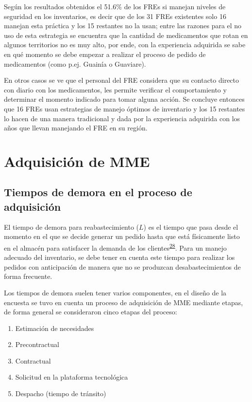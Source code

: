 \documentclass[
]{book}
\begin{document}
Según los resultados obtenidos el 51.6\% de los FREs si manejan niveles de seguridad en los inventarios, es decir que de los 31 FREs existentes solo 16 manejan esta práctica y los 15 restantes no la usan; entre las razones para el no uso de esta estrategia se encuentra que la cantidad de medicamentos que rotan en algunos territorios no es muy alto, por ende, con la experiencia adquirida se sabe en qué momento se debe empezar a realizar el proceso de pedido de medicamentos (como p.ej. Guainía o Guaviare).

En otros casos se ve que el personal del FRE considera que su contacto directo con diario con los medicamentos, les permite verificar el comportamiento y determinar el momento indicado para tomar alguna acción. Se concluye entonces que 16 FREs usan estrategias de manejo óptimos de inventario y los 15 restantes lo hacen de una manera tradicional y dada por la experiencia adquirida con los años que llevan manejando el FRE en su región.

\hypertarget{adquisiciuxf3n-de-mme}{%
\section{Adquisición de MME}\label{adquisiciuxf3n-de-mme}}

\hypertarget{tiempos-de-demora-en-el-proceso-de-adquisiciuxf3n}{%
\subsection{Tiempos de demora en el proceso de adquisición}\label{tiempos-de-demora-en-el-proceso-de-adquisiciuxf3n}}

El tiempo de demora para reabastecimiento (\(L\)) es el tiempo que pasa desde el momento en el que se decide generar un pedido hasta que está físicamente listo en el almacén para satisfacer la demanda de los clientes\textsuperscript{\protect\hyperlink{ref-Silver2017}{28}}. Para un manejo adecuado del inventario, se debe tener en cuenta este tiempo para realizar los pedidos con anticipación de manera que no se produzcan desabastecimientos de forma frecuente.

Los tiempos de demora suelen tener varios componentes, en el diseño de la encuesta se tuvo en cuenta un proceso de adquisición de MME mediante etapas, de forma general se consideraron cinco etapas del proceso:

\begin{enumerate}
\def\labelenumi{\arabic{enumi}.}
\item
  Estimación de necesidades
\item
  Precontractual
\item
  Contractual
\item
  Solicitud en la plataforma tecnológica
\item
  Despacho (tiempo de tránsito)
\end{enumerate}
\end{document}
